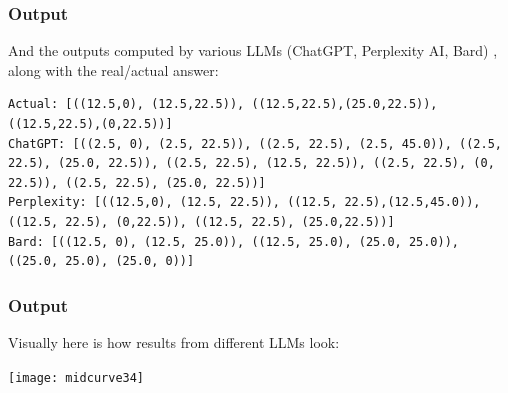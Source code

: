 \begin{frame}[fragile]\frametitle{Output}
And the outputs computed by various LLMs (ChatGPT, Perplexity AI, Bard) , along with the real/actual answer:

\begin{lstlisting}
Actual: [((12.5,0), (12.5,22.5)), ((12.5,22.5),(25.0,22.5)), ((12.5,22.5),(0,22.5))]
ChatGPT: [((2.5, 0), (2.5, 22.5)), ((2.5, 22.5), (2.5, 45.0)), ((2.5, 22.5), (25.0, 22.5)), ((2.5, 22.5), (12.5, 22.5)), ((2.5, 22.5), (0, 22.5)), ((2.5, 22.5), (25.0, 22.5))]
Perplexity: [((12.5,0), (12.5, 22.5)), ((12.5, 22.5),(12.5,45.0)), ((12.5, 22.5), (0,22.5)), ((12.5, 22.5), (25.0,22.5))]
Bard: [((12.5, 0), (12.5, 25.0)), ((12.5, 25.0), (25.0, 25.0)), ((25.0, 25.0), (25.0, 0))]
\end{lstlisting}	
\end{frame}

\begin{frame}[fragile]\frametitle{Output}

Visually here is how results from different LLMs look:

\begin{center}
\texttt{[image: midcurve34]}
\end{center}	
\end{frame}



